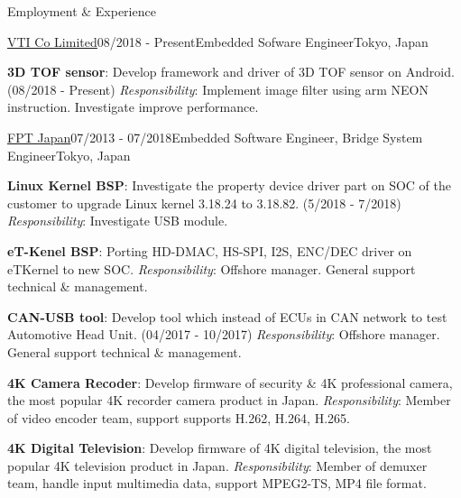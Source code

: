 \documentclass{resume}
\begin{document}
  \begin{rSection}{Employment \& Experience}
  
    \begin{rSubsection}{\href{https://www.vti.com.vn/company-vti-japan/}{\underline{VTI Co Limited}}}{08/2018 - Present}{Embedded Sofware Engineer}{Tokyo, Japan}
    \item \textbf{3D TOF sensor}: Develop framework and driver of 3D TOF sensor on Android. (08/2018 - Present)
    \newline \textit{Responsibility}: Implement image filter using arm NEON instruction. Investigate improve performance.
    \end{rSubsection}
  
    \begin{rSubsection}{\href{https://www.fpt-software.jp/company-information/fpt-japan/}{\underline{FPT Japan}}}{07/2013 - 07/2018}{Embedded Software Engineer, Bridge System Engineer}{Tokyo, Japan}
    \item \textbf{Linux Kernel BSP}: Investigate the property device driver part on SOC of the customer to upgrade Linux kernel 3.18.24 to 3.18.82. (5/2018 - 7/2018)
    \newline \textit{Responsibility}: Investigate USB module.

    \item \textbf{eT-Kenel BSP}: Porting HD-DMAC, HS-SPI, I2S, ENC/DEC driver on eTKernel to new SOC.
    \newline \textit{Responsibility}: Offshore manager. General support technical \& management.

    \item \textbf{CAN-USB tool}: Develop tool which instead of ECUs in CAN network to test Automotive Head Unit. (04/2017 - 10/2017) 
    \newline \textit{Responsibility}: Offshore manager. General support technical \& management.

    \item \textbf{4K Camera Recoder}: Develop firmware of security \& 4K professional camera, the most popular 4K recorder camera product in Japan.
    \newline \textit{Responsibility}: Member of video encoder team, support supports H.262, H.264, H.265.

    \item \textbf{4K Digital Television}: Develop firmware of 4K digital television, the most popular 4K television product in Japan.
    \newline \textit{Responsibility}: Member of demuxer team, handle input multimedia data, support MPEG2-TS, MP4 file format.


\end{rSubsection}
\end{rSection}
\end{document}
